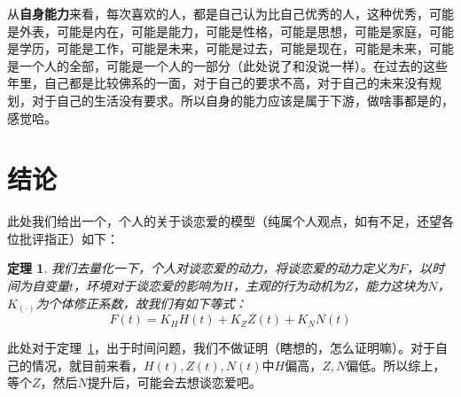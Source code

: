 \documentclass{article}
\newtheorem{theorem}{定理}
\begin{document}
从\textbf{自身能力}来看，每次喜欢的人，都是自己认为比自己优秀的人，这种优秀，可能是外表，可能是内在，可能是能力，可能是性格，可能是思想，可能是家庭，可能是学历，可能是工作，可能是未来，可能是过去，可能是现在，可能是未来，可能是一个人的全部，可能是一个人的一部分（此处说了和没说一样）。在过去的这些年里，自己都是比较佛系的一面，对于自己的要求不高，对于自己的未来没有规划，对于自己的生活没有要求。所以自身的能力应该是属于下游，做啥事都是的，感觉哈。

\section{结论}
此处我们给出一个，个人的关于谈恋爱的模型（纯属个人观点，如有不足，还望各位批评指正）如下：

\begin{theorem}
    \label{thm:love}
    我们去量化一下，个人对谈恋爱的动力，将谈恋爱的动力定义为$F$，以时间为自变量$t$，环境对于谈恋爱的影响为$H$，主观的行为动机为$Z$，能力这块为$N$，$K_{(\cdot)}$为个体修正系数，故我们有如下等式：
    \begin{equation}
        F(t) = K_{H}H(t) + K_{Z}Z(t) + K_{N}N(t)
    \end{equation}
\end{theorem}

此处对于定理~\ref{thm:love}，出于时间问题，我们不做证明（瞎想的，怎么证明嘛）。对于自己的情况，就目前来看，$H(t),Z(t),N(t)$中$H$偏高，$Z,N$偏低。所以综上，等个$Z$，然后$N$提升后，可能会去想谈恋爱吧。
\end{document}
